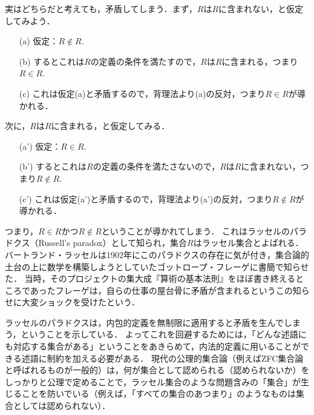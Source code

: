 \documentclass[11pt,a4paper]{jsarticle}
\begin{document}
実はどちらだと考えても，矛盾してしまう．まず，$R$は$R$に含まれない，と仮定してみよう．
\begin{itemize}
 \item[(a)] 仮定：$R \not\in R$.
 \item[(b)] するとこれは$R$の定義の条件を満たすので，$R$は$R$に含まれる，つまり$R \in R$.
 \item[(c)] これは仮定(a)と矛盾するので，背理法より(a)の反対，つまり$R \in R$が導かれる．
\end{itemize}
次に，$R$は$R$に含まれる，と仮定してみる．
\begin{itemize}
 \item[(a')] 仮定：$R \in R$.
 \item[(b')] するとこれは$R$の定義の条件を満たさないので，$R$は$R$に含まれない，つまり$R \not\in R$.
 \item[(c')] これは仮定(a')と矛盾するので，背理法より(a')の反対，つまり$R \not\in R$が導かれる．
\end{itemize}
つまり，$R \in R$かつ$R \not\in R$ということが導かれてしまう．
これはラッセルのパラドクス（Russell's paradox）として知られ，集合$R$はラッセル集合とよばれる．
バートランド・ラッセルは1902年にこのパラドクスの存在に気が付き，集合論的土台の上に数学を構築しようとしていたゴットロープ・フレーゲに書簡で知らせた．
当時，そのプロジェクトの集大成『算術の基本法則』をほぼ書き終えるところであったフレーゲは，自らの仕事の屋台骨に矛盾が含まれるというこの知らせに大変ショックを受けたという．

ラッセルのパラドクスは，内包的定義を無制限に適用すると矛盾を生んでしまう，ということを示している．
よってこれを回避するためには，「どんな述語にも対応する集合がある」ということをあきらめて，内法的定義に用いることができる述語に制約を加える必要がある．
現代の公理的集合論（例えばZFC集合論と呼ばれるものが一般的）は，何が集合として認められる（認められないか）をしっかりと公理で定めることで，ラッセル集合のような問題含みの「集合」が生じることを防いでいる（例えば，「すべての集合のあつまり」のようなものは集合としては認められない）．





\end{document}
